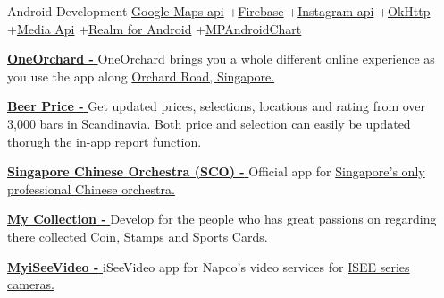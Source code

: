 \begin{projectentries}
    \projectentry 
    {Android Development} 
    {{\href{https://developers.google.com/maps/documentation/android-sdk/start}{Google Maps api}}
    +{\href{https://firebase.google.com}{Firebase}}
    +{\href{https://www.instagram.com/developer/}{Instagram api}}
    +{\href{http://square.github.io/okhttp/}{OkHttp}}
    +{\href{https://developer.android.com/guide/topics/media/}{Media Api}}
    +{\href{https://realm.io/docs/java/latest/}{Realm for Android}}
    +{\href{https://github.com/PhilJay/MPAndroidChart}{MPAndroidChart}}}
    {
      \begin{projectitems} %
        \item {{\href{https://play.google.com/store/apps/details?id=com.orba.OneOrchard}{\textbf{OneOrchard - }}}
        OneOrchard brings you a whole different online experience as you use the app along 
        {\href{http://www.orchardroad.org/}{Orchard Road, Singapore.}}}
        \item {{\href{https://annanovas.com/portfolio/beer-prices-android/}{\textbf{Beer Price - }}}
        Get updated prices, selections, locations and rating from over 3,000 bars in Scandinavia. Both price and selection can easily be 
        updated thorugh the in-app report function.}  
        \item {{\href{https://play.google.com/store/apps/details?id=com.SingaporeChineseOrchestra.SCO}{\textbf{Singapore Chinese Orchestra (SCO) - }}}
        Official app for 
        {\href{https://www.sco.com.sg}{Singapore’s only professional Chinese orchestra.}}}  
        \item {{\href{https://annanovas.com/portfolio/my-collection/}{\textbf{My Collection - }}}
        Develop for the people who has great passions on regarding there collected Coin, Stamps and Sports Cards.}  
        \item {{\href{https://play.google.com/store/apps/details?id=com.napco.uidealer.myiseevideo}{\textbf{MyiSeeVideo - }}}
        iSeeVideo app for Napco's video services for 
        {\href{http://www.napcosecurity.com/products/isee-ivr250/}{ISEE series cameras.}}}  

\end{projectitems}}
\end{projectentries}
